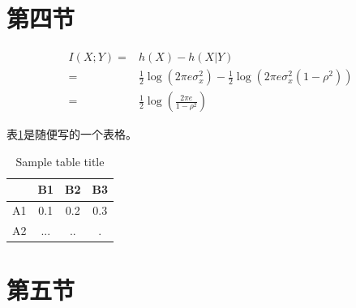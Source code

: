 \documentclass[%
aps,
prl,
12pt, 
twocolumn,
preprint,
reprint,
amsmath,
amssymb
]{revtex4-1}
\begin{document}
\section{第四节}

\lipsum[1]

\begin{align*}
I(X;Y) = & h(X)-h(X|Y)\\
= & \frac{1}{2}\log(2\pi e \sigma_x^2) - \frac{1}{2}\log(2\pi e \sigma_x^2(1-\rho^2))\\
= & \frac{1}{2}\log(\frac{2\pi e}{1-\rho^2})
\end{align*}

表\ref{tab1}是随便写的一个表格。

\begin{table}[h!]
\caption{Sample table title}
\label{tab1} 
      \begin{tabular}{cccc}
        \hline
           & B1  &B2   & B3\\ \hline
        A1 & 0.1 & 0.2 & 0.3\\
        A2 & ... & ..  & .\\
      \end{tabular}
\end{table}


\section{第五节}
\lipsum[1]
\end{document}
